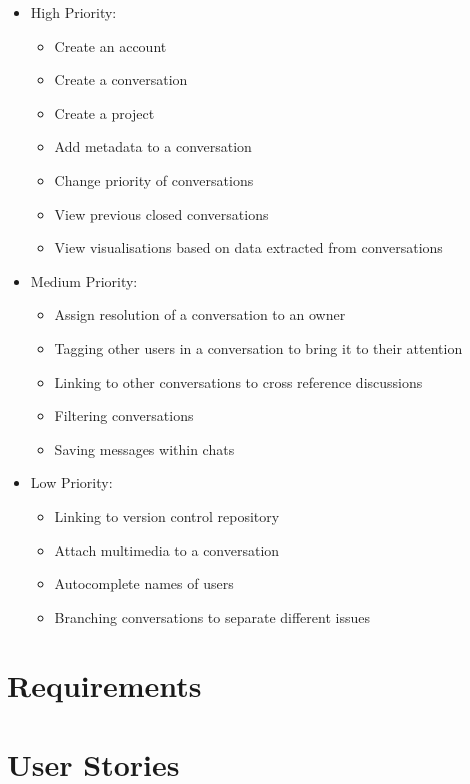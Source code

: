 \documentclass[a4paper]{l3proj}
\begin{document}
  \begin{itemize}
    \item High Priority:
    \begin{itemize}
      \item Create an account
  	\item Create a conversation
  	\item Create a project
  	\item Add metadata to a conversation
  	\item Change priority of conversations
  	\item View previous closed conversations
  	\item View visualisations based on data extracted from conversations
    \end{itemize}
    \item Medium Priority:
    \begin{itemize}
      \item Assign resolution of a conversation to an owner
  	\item Tagging other users in a conversation to bring it to their attention
  	\item Linking to other conversations to cross reference discussions
  	\item Filtering conversations
  	\item Saving messages within chats
    \end{itemize}
    \item Low Priority:
    \begin{itemize}
      \item Linking to version control repository
  	\item Attach multimedia to a conversation
  	\item Autocomplete names of users
  	\item Branching conversations to separate different issues
    \end{itemize}
  \end{itemize}

  \section{Requirements}
  \label{requirements}

  \section{User Stories}
  \label{userStories}
\end{document}

